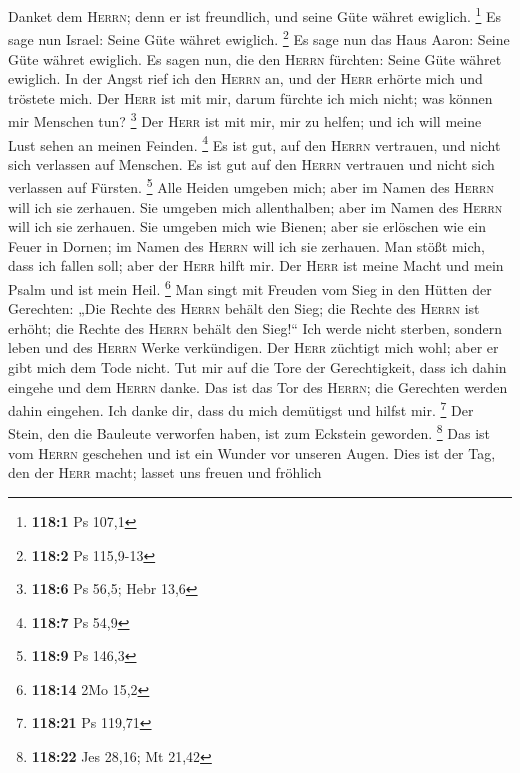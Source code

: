  Danket dem \textsc{Herrn}; denn er ist freundlich, und
seine Güte währet ewiglich. \footnote{\textbf{118:1} Ps 107,1}
 Es sage nun Israel: Seine Güte währet ewiglich.
\footnote{\textbf{118:2} Ps 115,9-13}  Es sage nun das
Haus Aaron: Seine Güte währet ewiglich.  Es sagen nun, die
den \textsc{Herrn} fürchten: Seine Güte währet ewiglich. 
In der Angst rief ich den \textsc{Herrn} an, und der \textsc{Herr}
erhörte mich und tröstete mich.  Der \textsc{Herr} ist mit
mir, darum fürchte ich mich nicht; was können mir Menschen tun?
\footnote{\textbf{118:6} Ps 56,5; Hebr 13,6}  Der
\textsc{Herr} ist mit mir, mir zu helfen; und ich will meine Lust sehen
an meinen Feinden. \footnote{\textbf{118:7} Ps 54,9}  Es
ist gut, auf den \textsc{Herrn} vertrauen, und nicht sich verlassen auf
Menschen.  Es ist gut auf den \textsc{Herrn} vertrauen und
nicht sich verlassen auf Fürsten. \footnote{\textbf{118:9} Ps 146,3}
 Alle Heiden umgeben mich; aber im Namen des
\textsc{Herrn} will ich sie zerhauen.  Sie umgeben mich
allenthalben; aber im Namen des \textsc{Herrn} will ich sie zerhauen.
 Sie umgeben mich wie Bienen; aber sie erlöschen wie ein
Feuer in Dornen; im Namen des \textsc{Herrn} will ich sie zerhauen.
 Man stößt mich, dass ich fallen soll; aber der
\textsc{Herr} hilft mir.  Der \textsc{Herr} ist meine
Macht und mein Psalm und ist mein Heil. \footnote{\textbf{118:14} 2Mo
  15,2}  Man singt mit Freuden vom Sieg in den Hütten der
Gerechten: „Die Rechte des \textsc{Herrn} behält den Sieg;
 die Rechte des \textsc{Herrn} ist erhöht; die Rechte des
\textsc{Herrn} behält den Sieg!{}``  Ich werde nicht
sterben, sondern leben und des \textsc{Herrn} Werke verkündigen.
 Der \textsc{Herr} züchtigt mich wohl; aber er gibt mich
dem Tode nicht.  Tut mir auf die Tore der Gerechtigkeit,
dass ich dahin eingehe und dem \textsc{Herrn} danke.  Das
ist das Tor des \textsc{Herrn}; die Gerechten werden dahin eingehen.
 Ich danke dir, dass du mich demütigst und hilfst mir.
\footnote{\textbf{118:21} Ps 119,71}  Der Stein, den die
Bauleute verworfen haben, ist zum Eckstein geworden. \footnote{\textbf{118:22}
  Jes 28,16; Mt 21,42}  Das ist vom \textsc{Herrn}
geschehen und ist ein Wunder vor unseren Augen.  Dies ist
der Tag, den der \textsc{Herr} macht; lasset uns freuen und fröhlich
